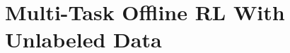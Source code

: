 \documentclass[../thesis.tex]{subfiles}
\begin{document}
    


\vspace{-0.2cm}
\section{Multi-Task Offline RL With Unlabeled Data}
\label{sec:uds_section}
\vspace{-0.2cm}
\end{document}
